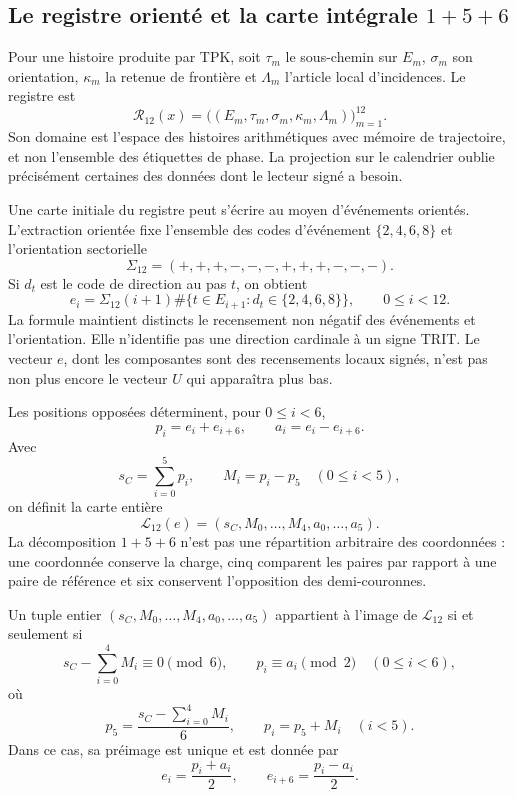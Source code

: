 \subsection{Le registre orienté et la carte intégrale \texorpdfstring{\(1+5+6\)}{1+5+6}}
\label{x_reciprocidad:subsec:k-registro-integral}

Pour une histoire produite par TPK, soit \(\tau_m\) le sous-chemin sur \(E_m\), \(\sigma_m\) son orientation, \(\kappa_m\) la retenue de frontière et \(\Lambda_m\) l'article local d'incidences. Le registre est
\[
 \mathcal R_{12}(x)=
 \bigl((E_m,\tau_m,\sigma_m,\kappa_m,\Lambda_m)\bigr)_{m=1}^{12}.
\]
Son domaine est l'espace des histoires arithmétiques avec mémoire de trajectoire, et non l'ensemble des
étiquettes de phase. La projection sur le calendrier oublie précisément certaines
des données dont le lecteur signé a besoin.

Une carte initiale du registre peut s'écrire au moyen d'événements orientés. L'extraction orientée fixe l'ensemble des codes d'événement \(\{2,4,6,8\}\) et l'orientation sectorielle
\[
 \Sigma_{12}=(+,+,+,-,-,-,+,+,+,-,-,-).
\]
Si \(d_t\) est le code de direction au pas \(t\), on obtient
\[
 e_i=\Sigma_{12}(i+1)
 \#\{t\in E_{i+1}:d_t\in\{2,4,6,8\}\},
 \qquad0\leq i<12.
\]
La formule maintient distincts le recensement non négatif des événements et
l'orientation. Elle n'identifie pas une direction cardinale à un signe TRIT. Le
vecteur \(e\), dont les composantes sont des recensements locaux signés, n'est pas non plus
encore le vecteur \(U\) qui apparaîtra plus bas.

Les positions opposées déterminent, pour \(0\leq i<6\),
\[
 p_i=e_i+e_{i+6},\qquad a_i=e_i-e_{i+6}.
\]
Avec
\[
 s_C=\sum_{i=0}^{5}p_i,\qquad M_i=p_i-p_5\quad(0\leq i<5),
\]
on définit la carte entière
\[
 \mathcal L_{12}(e)
 =(s_C,M_0,\ldots,M_4,a_0,\ldots,a_5).
\]
La décomposition \(1+5+6\) n'est pas une répartition arbitraire des coordonnées :
une coordonnée conserve la charge, cinq comparent les paires par rapport à une
paire de référence et six conservent l'opposition des demi-couronnes.

\begin{lemma}
\label{x_reciprocidad:lem:k-carta-integral}
Un tuple entier \((s_C,M_0,\ldots,M_4,a_0,\ldots,a_5)\) appartient à l'image de \(\mathcal L_{12}\) si et seulement si
\[
 s_C-\sum_{i=0}^{4}M_i\equiv0\pmod6,
 \qquad p_i\equiv a_i\pmod2\quad(0\leq i<6),
\]
où
\[
 p_5=\frac{s_C-\sum_{i=0}^{4}M_i}{6},\qquad p_i=p_5+M_i\quad(i<5).
\]
Dans ce cas, sa préimage est unique et est donnée par
\[
 e_i=\frac{p_i+a_i}{2},\qquad e_{i+6}=\frac{p_i-a_i}{2}.
\]
\end{lemma}

